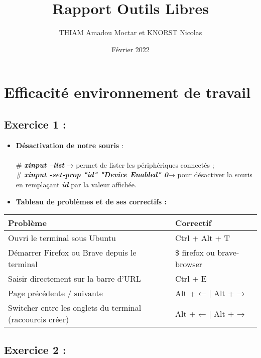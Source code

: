 \documentclass[a4paper]{article}
\title{Rapport Outils Libres}
\author{THIAM Amadou Moctar et KNORST Nicolas }
\date{Février 2022}
\begin{document}
\maketitle

\section{Efficacité environnement de travail}

\subsection{ Exercice 1 : }

\begin{itemize}
    \item \textbf{Désactivation de notre souris} : \\
    \\ \# \textit{\textbf{xinput --list}} → permet de lister les périphériques connectés ; \\
    \# \textit{\textbf{xinput -set-prop "id" "Device Enabled" 0}}→ pour désactiver la souris en remplaçant \textit{\textbf{id}} par la valeur affichée.\\
    
\item \textbf{Tableau de problèmes et de ses correctifs :} \\

\end{itemize} 
\begin{tabular}{|l|l|}
     \hline 
     Problème & Correctif\\
     \hline
     Ouvri le terminal sous Ubuntu & Ctrl + Alt + T\\
     \hline
     Démarrer Firefox ou Brave depuis le terminal & \$ firefox ou brave-browser \\
     \hline
     Saisir directement sur la barre d'URL & Ctrl + E \\
     \hline
     Page précédente / suivante & Alt + ← | Alt + → \\
     \hline
     Switcher entre les onglets du terminal (raccourcis créer) & Alt + ← | Alt + → \\
     \hline
\end{tabular}

\subsection{Exercice 2 :}
\end{document}
